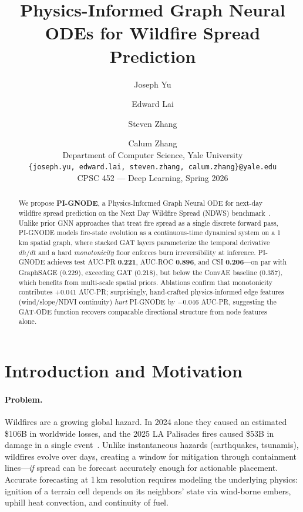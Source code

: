 \documentclass{article}
\title{Physics-Informed Graph Neural ODEs for Wildfire Spread Prediction}
\author{%
  Joseph Yu \and Edward Lai \and Steven Zhang \and Calum Zhang \\
  Department of Computer Science, Yale University \\
  \texttt{\{joseph.yu, edward.lai, steven.zhang, calum.zhang\}@yale.edu} \\
  CPSC 452 --- Deep Learning, Spring 2026
}
\begin{document}
\maketitle

\begin{abstract}
We propose \textbf{PI-GNODE}, a Physics-Informed Graph Neural ODE for next-day
wildfire spread prediction on the Next Day Wildfire Spread (NDWS)
benchmark~\cite{huot2022nextday}. Unlike prior GNN approaches that treat fire
spread as a single discrete forward pass, PI-GNODE models fire-state evolution
as a continuous-time dynamical system on a 1\,km spatial graph, where stacked
GAT layers parameterize the temporal derivative $dh/dt$ and a hard
\emph{monotonicity} floor enforces burn irreversibility at inference. PI-GNODE
achieves test AUC-PR \textbf{0.221}, AUC-ROC \textbf{0.896}, and CSI
\textbf{0.206}---on par with GraphSAGE (0.229), exceeding GAT (0.218), but
below the ConvAE baseline (0.357), which benefits from multi-scale spatial
priors. Ablations confirm that monotonicity contributes $+0.041$ AUC-PR;
surprisingly, hand-crafted physics-informed edge features (wind/slope/NDVI
continuity) \emph{hurt} PI-GNODE by $-0.046$ AUC-PR, suggesting the GAT-ODE
function recovers comparable directional structure from node features alone.
\end{abstract}

\section{Introduction and Motivation}\label{sec:intro}

\paragraph{Problem.} Wildfires are a growing global hazard. In 2024 alone they
caused an estimated \$106B in worldwide losses, and the 2025 LA Palisades fires
caused \$53B in damage in a single event~\cite{gallagher2024}. Unlike
instantaneous hazards (earthquakes, tsunamis), wildfires evolve over days,
creating a window for mitigation through containment lines---\emph{if} spread
can be forecast accurately enough for actionable placement. Accurate
forecasting at 1\,km resolution requires modeling the underlying physics:
ignition of a terrain cell depends on its neighbors' state via wind-borne
embers, uphill heat convection, and continuity of fuel.
\end{document}
